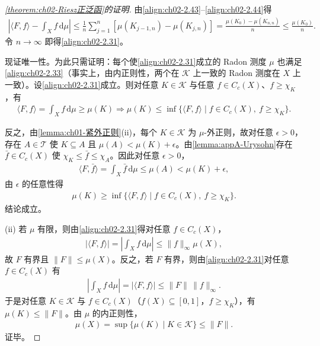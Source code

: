 \documentclass[../../main.tex]{subfiles}%
\begin{document}
\begin{proof}[\cref{theorem:ch02-Riesz正泛函}的证明]
由\eqref{align:ch02-2.43}--\eqref{align:ch02-2.44}得
\begin{align*}
\left|\langle F,f\rangle-\int_X f\,\mathrm{d}\mu\right|
\leqslant\frac1n\sum_{j=1}^n[\mu(K_{j-1,n})-\mu(K_{j,n})]
=\frac{\mu(K_0)-\mu(K_{n,n})}n\leqslant\frac{\mu(K_0)}n.
\end{align*}
令 $n\to\infty$ 即得\eqref{align:ch02-2.31}。

现证唯一性。为此只需证明：每个使\eqref{align:ch02-2.31}成立的 Radon 测度 $\mu$ 也满足\eqref{align:ch02-2.33}（事实上，由内正则性，两个在 $\mathscr K$ 上一致的 Radon 测度在 $X$ 上一致）。设\eqref{align:ch02-2.31}成立。则对任意 $K\in\mathscr K$ 与任意 $f\in C_c(X)$、$f\geqslant\chi_K$，有
\begin{align*}
\langle F,f\rangle=\int_X f\,\mathrm{d}\mu\geqslant\mu(K)
\Rightarrow\mu(K)\leqslant\inf\{\langle F,f\rangle\mid f\in C_c(X),\ f\geqslant\chi_K\}.
\end{align*}

反之，由\cref{lemma:ch01-紧外正则}(ii)，每个 $K\in\mathscr K$ 为 $\mu$-外正则，故对任意 $\epsilon>0$，存在 $A\in\mathscr T$ 使 $K\subseteq A$ 且 $\mu(A)<\mu(K)+\epsilon$。由\cref{lemma:appA-Urysohn}存在 $\bar f\in C_c(X)$ 使 $\chi_K\leqslant\bar f\leqslant\chi_A$。因此对任意 $\epsilon>0$，
\begin{align*}
\langle F,\bar f\rangle=\int_X\bar f\,\mathrm{d}\mu\leqslant\mu(A)<\mu(K)+\epsilon,
\end{align*}
由 $\epsilon$ 的任意性得
\begin{align*}
\mu(K)\geqslant\inf\{\langle F,f\rangle\mid f\in C_c(X),\ f\geqslant\chi_K\}.
\end{align*}
结论成立。

(ii) 若 $\mu$ 有限，则由\eqref{align:ch02-2.31}得对任意 $f\in C_c(X)$，
\begin{align*}
|\langle F,f\rangle|=\left|\int_X f\,\mathrm{d}\mu\right|\leqslant\|f\|_\infty\mu(X),
\end{align*}
故 $F$ 有界且 $\|F\|\leqslant\mu(X)$。反之，若 $F$ 有界，则由\eqref{align:ch02-2.31}对任意 $f\in C_c(X)$ 有
\begin{align*}
\left|\int_X f\,\mathrm{d}\mu\right|=|\langle F,f\rangle|\leqslant\|F\|\,\|f\|_\infty.
\end{align*}
于是对任意 $K\in\mathscr K$ 与 $f\in C_c(X)$（$f(X)\subseteq[0,1]$，$f\geqslant\chi_K$），有 $\mu(K)\leqslant\|F\|$。由 $\mu$ 的内正则性，
\begin{align*}
\mu(X)=\sup\{\mu(K)\mid K\in\mathscr K\}\leqslant\|F\|.
\end{align*}
证毕。
\end{proof}
\end{document}
